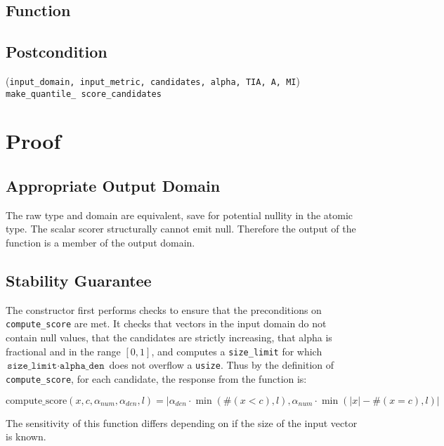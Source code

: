 \documentclass{article}
\begin{document}
\subsection*{Function}
\label{sec:python-pseudocode}



\subsection*{Postcondition}
\validTransformation
    {(\texttt{input\_domain, input\_metric, candidates, alpha, TIA, A, MI})}
    {\texttt{make\_quantile\_ score\_candidates}}

\section{Proof}
\subsection{Appropriate Output Domain}
\label{sec:approp-output-domain}
The raw type and domain are equivalent, save for potential nullity in the atomic type. 
The scalar scorer structurally cannot emit null.
Therefore the output of the function is a member of the output domain.

\subsection{Stability Guarantee}

The constructor first performs checks to ensure that the preconditions on \texttt{compute\_score} are met.
It checks that vectors in the input domain do not contain null values,
that the candidates are strictly increasing,
that alpha is fractional and in the range $[0, 1]$,
and computes a \texttt{size\_limit} for which $\texttt{size\_limit} \cdot \texttt{alpha\_den}$ does not overflow a \texttt{usize}.
Thus by the definition of \texttt{compute\_score}, for each candidate, the response from the function is:

\begin{equation}
    \textrm{compute\_score}(x, c, \alpha_{num}, \alpha_{den}, l) = |\alpha_{den} \cdot \min(\#(x < c), l), \alpha_{num} \cdot \min(|x| - \#(x = c), l)|
\end{equation}

The sensitivity of this function differs depending on if the size of the input vector is known.
\end{document}
